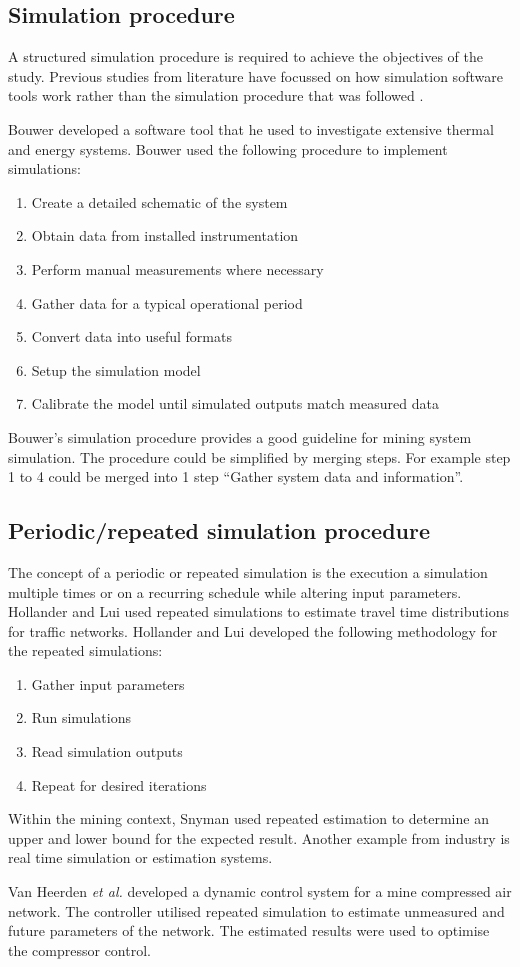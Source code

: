 	\subsection{Simulation procedure}
	A structured simulation procedure is required to achieve the objectives of the study. Previous studies from literature have focussed on how simulation software tools work rather than the simulation procedure that was followed \cite{Mare2016PhD}.
	\par
	Bouwer \cite{bouwer2004designing} developed a software tool that he used to investigate extensive thermal and energy systems. Bouwer used the following procedure to implement simulations:
	\begin{enumerate}
		\item Create a detailed schematic of the system
		\item Obtain data from installed instrumentation
		\item Perform manual measurements where necessary
		\item Gather data for a typical operational period
		\item Convert data into useful formats
		\item Setup the simulation model
		\item Calibrate the model until simulated outputs match measured data
	\end{enumerate}
	Bouwer's simulation procedure provides a good guideline for mining system simulation. The procedure could be simplified by merging steps. For example step 1 to 4 could be merged into 1 step \enquote{Gather system data and information}.
	\subsection{Periodic/repeated simulation procedure}
	The concept of a periodic or repeated simulation is the execution a simulation multiple times or on a recurring schedule while altering input parameters. Hollander and Lui \cite{Hollander2008Estimation} used repeated simulations to estimate travel time distributions for traffic networks. Hollander and Lui developed the following methodology for the repeated simulations:
	\begin{enumerate}
		\item Gather input parameters
		\item Run simulations
		\item Read simulation outputs
		\item Repeat for desired iterations
	\end{enumerate}
	\par
	 Within the mining context, Snyman \cite{Snyman2011Masters} used repeated estimation to determine an upper and lower bound for the expected result. Another example from industry is real time simulation or estimation systems.
	\par 
	 Van Heerden \textit{et al.} \cite{van2014developing} developed a dynamic control system for a mine compressed air network. The controller utilised repeated simulation to estimate unmeasured and future parameters of the network. The estimated results were used to optimise the compressor control.
	 \par
	
